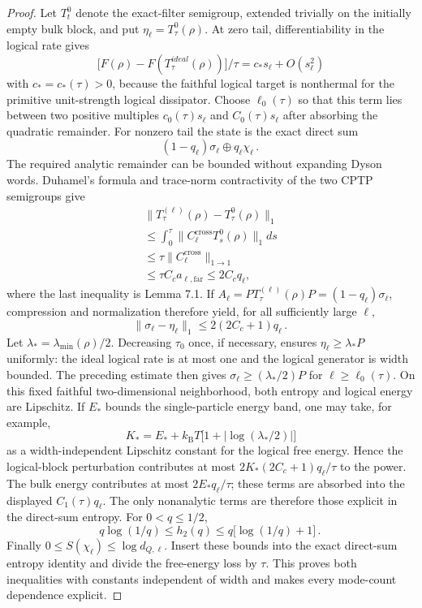 \documentclass[11pt,a4paper]{article}
\theoremstyle{remark}
\begin{document}
\begin{proof}
Let $T_t^0$ denote the exact-filter semigroup, extended trivially on the initially empty bulk block, and put $\eta_\ell=T_\tau^0(\rho)$. At zero tail, differentiability in the logical rate gives
\[
\bigl[F(\rho)-F(T_\tau^{ideal}(\rho))\bigr]/\tau=c_* s_\ell+O(s_\ell^{2})
\]
with $c_*=c_*(\tau)>0$, because the faithful logical target is nonthermal for the primitive unit-strength logical dissipator. Choose $\ell_0(\tau)$ so that this term lies between two positive multiples $c_0(\tau)s_\ell$ and $C_0(\tau)s_\ell$ after absorbing the quadratic remainder.
For nonzero tail the state is the exact direct sum
\[
(1-q_\ell)\sigma_\ell \oplus q_\ell \chi_\ell\mathpunct{.}
\]
The required analytic remainder can be bounded without expanding Dyson words. Duhamel's formula and trace-norm contractivity of the two CPTP semigroups give
\[
\begin{gathered}
\lVert T_\tau^{(\ell)}(\rho)-T_\tau^0(\rho)\rVert_1 \\
\le \int_{0}^{\tau} \lVert C_\ell^{\mathrm{cross}} T_s^0(\rho)\rVert_1 ds \\
\le \tau \lVert C_\ell^{\mathrm{cross}}\rVert_{1\to 1} \\
\le \tau C_c a_{\ell,\mathrm{far}}\le 2C_c q_\ell\mathpunct{,}
\end{gathered}
\]
where the last inequality is Lemma 7.1. If $A_\ell=P T_\tau^{(\ell)}(\rho)P=(1-q_\ell)\sigma_\ell$, compression and normalization therefore yield, for all sufficiently large $\ell$,
\[
\lVert \sigma_\ell-\eta_\ell\rVert_1\le 2(2C_c+1)q_\ell\mathpunct{.}
\]
Let $\lambda_*=\lambda_{\min}(\rho)/2$. Decreasing $\tau_0$ once, if necessary, ensures $\eta_\ell\ge \lambda_*P$ uniformly: the ideal logical rate is at most one and the logical generator is width bounded. The preceding estimate then gives $\sigma_\ell\ge (\lambda_*/2)P$ for $\ell\ge \ell_0(\tau)$. On this fixed faithful two-dimensional neighborhood, both entropy and logical energy are Lipschitz. If $E_*$ bounds the single-particle energy band, one may take, for example,
\[
K_*=E_*+k_{\mathrm B} T\bigl[1+|\log(\lambda_*/2)|\bigr]
\]
as a width-independent Lipschitz constant for the logical free energy. Hence the logical-block perturbation contributes at most $2K_*(2C_c+1)q_\ell/\tau$ to the power. The bulk energy contributes at most $2E_*q_\ell/\tau$; these terms are absorbed into the displayed $C_1(\tau)q_\ell$.
The only nonanalytic terms are therefore those explicit in the direct-sum entropy. For $0<q\le 1/2$,
\[
q \log(1/q)\le h_2(q)\le q\bigl[\log(1/q)+1\bigr]\mathpunct{.}
\]
Finally $0\le S(\chi_\ell)\le \log d_{Q,\ell}$. Insert these bounds into the exact direct-sum entropy identity and divide the free-energy loss by $\tau$. This proves both inequalities with constants independent of width and makes every mode-count dependence explicit.
\end{proof}
\end{document}
